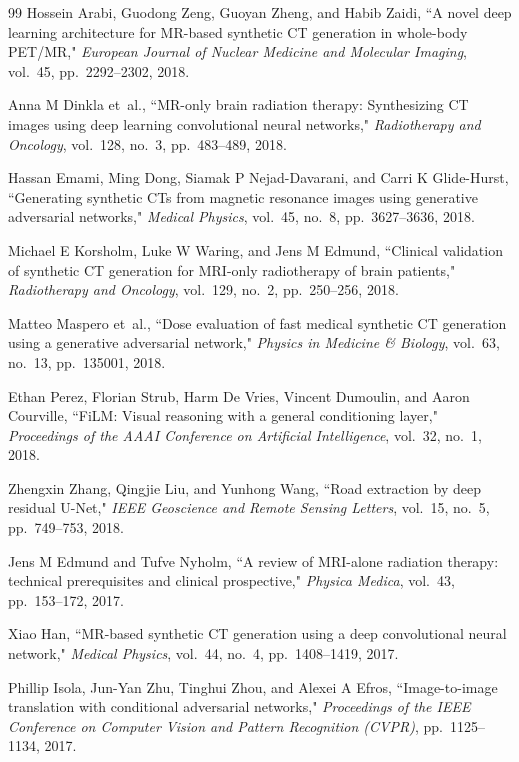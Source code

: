 \begin{thebibliography}{99}
Hossein Arabi, Guodong Zeng, Guoyan Zheng, and Habib Zaidi, ``A novel deep learning architecture for MR-based synthetic CT generation in whole-body PET/MR," \emph{European Journal of Nuclear Medicine and Molecular Imaging}, vol.~45, pp.~2292--2302, 2018.

Anna M Dinkla et~al., ``MR-only brain radiation therapy: Synthesizing CT images using deep learning convolutional neural networks," \emph{Radiotherapy and Oncology}, vol.~128, no.~3, pp.~483--489, 2018.

Hassan Emami, Ming Dong, Siamak P Nejad-Davarani, and Carri K Glide-Hurst, ``Generating synthetic CTs from magnetic resonance images using generative adversarial networks," \emph{Medical Physics}, vol.~45, no.~8, pp.~3627--3636, 2018.

Michael E Korsholm, Luke W Waring, and Jens M Edmund, ``Clinical validation of synthetic CT generation for MRI-only radiotherapy of brain patients," \emph{Radiotherapy and Oncology}, vol.~129, no.~2, pp.~250--256, 2018.

Matteo Maspero et~al., ``Dose evaluation of fast medical synthetic CT generation using a generative adversarial network," \emph{Physics in Medicine \& Biology}, vol.~63, no.~13, pp.~135001, 2018.

Ethan Perez, Florian Strub, Harm De Vries, Vincent Dumoulin, and Aaron Courville, ``FiLM: Visual reasoning with a general conditioning layer," \emph{Proceedings of the AAAI Conference on Artificial Intelligence}, vol.~32, no.~1, 2018.

Zhengxin Zhang, Qingjie Liu, and Yunhong Wang, ``Road extraction by deep residual U-Net," \emph{IEEE Geoscience and Remote Sensing Letters}, vol.~15, no.~5, pp.~749--753, 2018.

Jens M Edmund and Tufve Nyholm, ``A review of MRI-alone radiation therapy: technical prerequisites and clinical prospective," \emph{Physica Medica}, vol.~43, pp.~153--172, 2017.

Xiao Han, ``MR-based synthetic CT generation using a deep convolutional neural network," \emph{Medical Physics}, vol.~44, no.~4, pp.~1408--1419, 2017.

Phillip Isola, Jun-Yan Zhu, Tinghui Zhou, and Alexei A Efros, ``Image-to-image translation with conditional adversarial networks," \emph{Proceedings of the IEEE Conference on Computer Vision and Pattern Recognition (CVPR)}, pp.~1125--1134, 2017.


\end{thebibliography}
